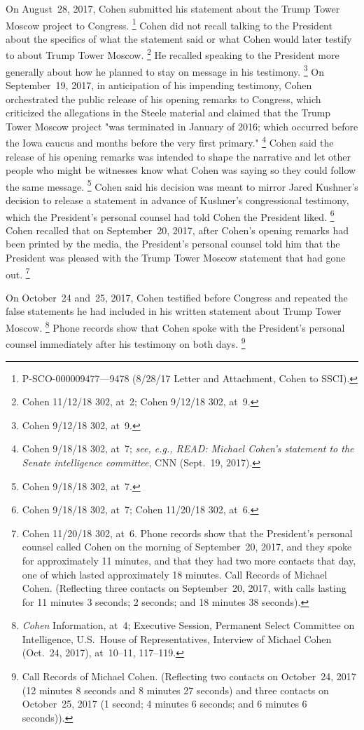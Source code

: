 On August~28, 2017, Cohen submitted his statement about the Trump Tower Moscow project to Congress.%
\footnote{P-SCO-000009477---9478 (8/28/17 Letter and Attachment, Cohen to SSCI).}
Cohen did not recall talking to the President about the specifics of what the statement said or what Cohen would later testify to about Trump Tower Moscow.%
\footnote{Cohen 11/12/18 302, at~2;
Cohen 9/12/18 302, at~9.}
He recalled speaking to the President more generally about how he planned to stay on message in his testimony.%
\footnote{Cohen 9/12/18 302, at~9.}
On September~19, 2017, in anticipation of his impending testimony, Cohen orchestrated the public release of his opening remarks to Congress, which criticized the allegations in the Steele material and claimed that the Trump Tower Moscow project "was terminated in January of 2016; which occurred before the Iowa caucus and months before the very first primary."%
\footnote{Cohen 9/18/18 302, at~7;
\textit{see, e.g., READ: Michael Cohen's statement to the Senate intelligence committee}, CNN (Sept.~19, 2017).}
Cohen said the release of his opening remarks was intended to shape the narrative and let other people who might be witnesses know what Cohen was saying so they could follow the same message.%
\footnote{Cohen 9/18/18 302, at~7.}
Cohen said his decision was meant to mirror Jared Kushner's decision to release a statement in advance of Kushner's congressional testimony, which the President's personal counsel had told Cohen the President liked.%
\footnote{Cohen 9/18/18 302, at~7;
Cohen 11/20/18 302, at~6.}
Cohen recalled that on September~20, 2017, after Cohen's opening remarks had been printed by the media, the President's personal counsel told him that the President was pleased with the Trump Tower Moscow statement that had gone out.%
\footnote{Cohen 11/20/18 302, at~6.
Phone records show that the President's personal counsel called Cohen on the morning of September~20, 2017, and they spoke for approximately 11 minutes, and that they had two more contacts that day, one of which lasted approximately 18 minutes.
Call Records of Michael Cohen. (Reflecting three contacts on September~20, 2017, with calls lasting for 11 minutes 3 seconds; 2 seconds; and 18 minutes 38 seconds).}

On October~24 and~25, 2017, Cohen testified before Congress and repeated the false statements he had included in his written statement about Trump Tower Moscow.%
\footnote{\textit{Cohen} Information, at~4;
Executive Session, Permanent Select Committee on Intelligence, U.S.~House of Representatives, Interview of Michael Cohen (Oct.~24, 2017), at~10--11, 117--119.}
Phone records show that Cohen spoke with the President's personal counsel immediately after his testimony on both days.%
\footnote{Call Records of Michael Cohen.
(Reflecting two contacts on October~24, 2017 (12 minutes 8 seconds and 8 minutes 27 seconds) and three contacts on October~25, 2017 (1 second; 4 minutes 6 seconds; and 6 minutes 6 seconds)).}

